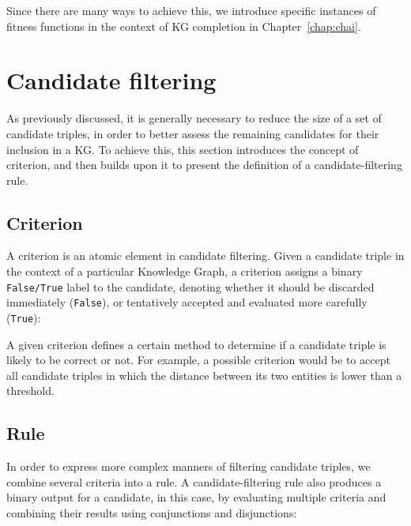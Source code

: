Since there are many ways to achieve this, we introduce specific instances of fitness functions in the context of KG completion in Chapter~\ref{chap:chai}.

\section{Candidate filtering}\label{sec:theo-rule}
As previously discussed, it is generally necessary to reduce the size of a set of candidate triples, in order to better assess the remaining candidates for their inclusion in a KG. To achieve this, this section introduces the concept of criterion, and then builds upon it to present the definition of a candidate-filtering rule.

\subsection{Criterion}
A criterion is an atomic element in candidate filtering. Given a candidate triple in the context of a particular Knowledge Graph, a criterion assigns a binary \texttt{False/True} label to the candidate, denoting whether it should be discarded immediately (\texttt{False}), or tentatively accepted and evaluated more carefully (\texttt{True}):


A given criterion defines a certain method to determine if a candidate triple is likely to be correct or not. For example, a possible criterion would be to accept all candidate triples in which the distance between its two entities is lower than a threshold.

\subsection{Rule}
In order to express more complex manners of filtering candidate triples, we combine several criteria into a rule. A candidate-filtering rule also produces a binary output for a candidate, in this case, by evaluating multiple criteria and combining their results using conjunctions and disjunctions:


